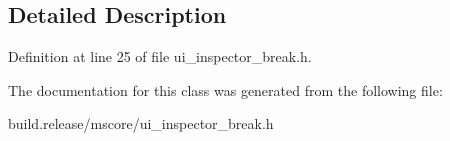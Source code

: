 \subsection{Detailed Description}


Definition at line 25 of file ui\+\_\+inspector\+\_\+break.\+h.



The documentation for this class was generated from the following file\+:\begin{DoxyCompactItemize}
\item 
build.\+release/mscore/ui\+\_\+inspector\+\_\+break.\+h\end{DoxyCompactItemize}
